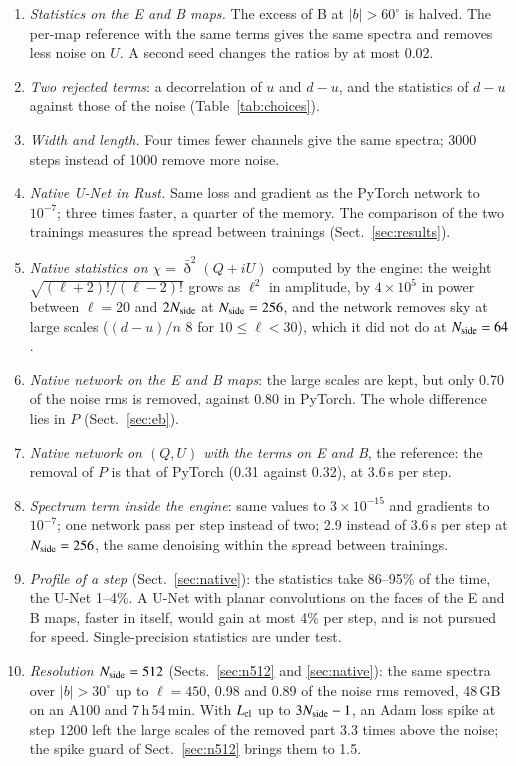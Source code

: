 \documentclass{aa}
\newcommand{\nside}{N_{\rm side}}
\begin{document}
\begin{enumerate}
  \item \emph{Statistics on the E and B maps.} The excess of B at $|b|>60^\circ$ is halved. The per-map reference with the same terms gives the same spectra and removes less noise on $U$. A second seed changes the ratios by at most 0.02.
  \item \emph{Two rejected terms}: a decorrelation of $u$ and $d-u$, and the statistics of $d-u$ against those of the noise (Table~\ref{tab:choices}).
  \item \emph{Width and length.} Four times fewer channels give the same spectra; 3000 steps instead of 1000 remove more noise.
  \item \emph{Native U-Net in Rust.} Same loss and gradient as the PyTorch network to $10^{-7}$; three times faster, a quarter of the memory. The comparison of the two trainings measures the spread between trainings (Sect.~\ref{sec:results}).
  \item \emph{Native statistics on $\chi=\bar\eth^2(Q+iU)$} computed by the engine: the weight $\sqrt{(\ell+2)!/(\ell-2)!}$ grows as $\ell^2$ in amplitude, by $4\times10^5$ in power between $\ell=20$ and $2\nside$ at $\nside=256$, and the network removes sky at large scales ($(d-u)/n$ 8 for $10\le\ell<30$), which it did not do at $\nside=64$.
  \item \emph{Native network on the E and B maps}: the large scales are kept, but only 0.70 of the noise rms is removed, against 0.80 in PyTorch. The whole difference lies in $P$ (Sect.~\ref{sec:eb}).
  \item \emph{Native network on $(Q,U)$ with the terms on E and B}, the reference: the removal of $P$ is that of PyTorch (0.31 against 0.32), at 3.6\,s per step.
  \item \emph{Spectrum term inside the engine}: same values to $3\times10^{-15}$ and gradients to $10^{-7}$; one network pass per step instead of two; 2.9 instead of 3.6\,s per step at $\nside=256$, the same denoising within the spread between trainings.
  \item \emph{Profile of a step} (Sect.~\ref{sec:native}): the statistics take 86--95\% of the time, the U-Net 1--4\%. A U-Net with planar convolutions on the faces of the E and B maps, faster in itself, would gain at most 4\% per step, and is not pursued for speed. Single-precision statistics are under test.
  \item \emph{Resolution $\nside=512$} (Sects.~\ref{sec:n512} and \ref{sec:native}): the same spectra over $|b|>30^\circ$ up to $\ell=450$, 0.98 and 0.89 of the noise rms removed, 48\,GB on an A100 and 7\,h\,54\,min. With $L_{\rm cl}$ up to $3\nside-1$, an Adam loss spike at step 1200 left the large scales of the removed part 3.3 times above the noise; the spike guard of Sect.~\ref{sec:n512} brings them to 1.5.

\end{enumerate}
\end{document}
